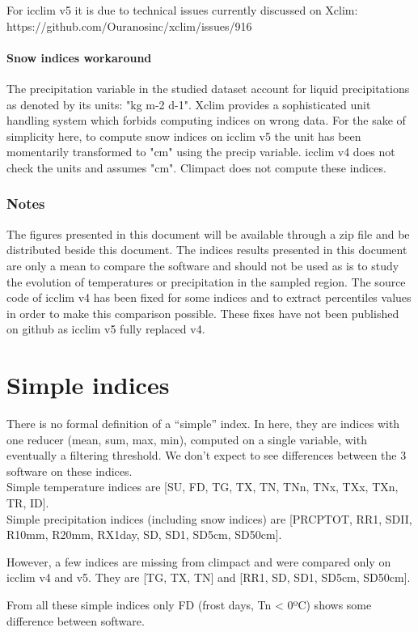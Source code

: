 \documentclass[a4paper,11pt]{article}
\begin{document}
    For icclim v5 it is due to technical issues currently discussed on Xclim: https://github.com/Ouranosinc/xclim/issues/916
\subsection{Snow indices workaround}
    The precipitation variable in the studied dataset account for liquid precipitations as denoted by its units: "kg m-2 d-1".
    Xclim provides a sophisticated unit handling system which forbids computing indices on wrong data. For the sake of simplicity here, to compute snow indices on icclim v5 the unit has been momentarily transformed to "cm" using the precip variable.
    icclim v4 does not check the units and assumes "cm".
    Climpact does not compute these indices.
\section{Notes}
    The figures presented in this document will be available through a zip file and be distributed beside this document.
    The indices results presented in this document are only a mean to compare the software and should not be used as is to study the evolution of temperatures or precipitation in the sampled region.
    The source code of icclim v4 has been fixed for some indices and to extract percentiles values in order to make this comparison possible. These fixes have not been published on github as icclim v5 fully replaced v4.


\part{Simple indices}
    There is no formal definition of a “simple” index. In here, they are indices with one reducer (mean, sum, max, min), computed on a single variable, with eventually a filtering threshold. We don’t expect to see differences between the 3 software on these indices.\\
    Simple temperature indices are [SU, FD, TG, TX, TN, TNn, TNx, TXx, TXn, TR, ID].\\
    Simple precipitation indices (including snow indices) are [PRCPTOT, RR1, SDII, R10mm, R20mm, RX1day, SD, SD1, SD5cm, SD50cm].

    However, a few indices are missing from climpact and were compared only on icclim v4 and v5. They are [TG, TX, TN] and [RR1, SD, SD1, SD5cm, SD50cm].

    From all these simple indices only FD (frost days, Tn < 0ºC) shows some difference between software.
\end{document}
